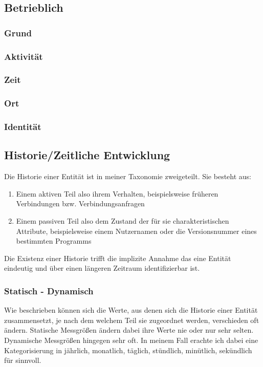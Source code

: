 \subsection{Betrieblich}
\subsubsection{Grund}
\subsubsection{Aktivität}
\subsubsection{Zeit}
\subsubsection{Ort}
\subsubsection{Identität}

\subsection{Historie/Zeitliche Entwicklung}
Die Historie einer Entität ist in meiner Taxonomie zweigeteilt. Sie besteht aus:
\begin{enumerate}
\item{Einem aktiven Teil also ihrem Verhalten, beispielsweise früheren Verbindungen bzw. Verbindungsanfragen}
\item{Einem passiven Teil also dem Zustand der für sie charakteristischen Attribute, beispielsweise einem Nutzernamen oder die Versionsnummer eines bestimmten Programms}
\end{enumerate}
Die Existenz einer Historie trifft die implizite Annahme das eine Entität eindeutig und über einen längeren Zeitraum identifizierbar ist.
\subsubsection{Statisch - Dynamisch}
Wie 
 beschrieben können sich die Werte, aus denen sich die Historie einer Entität zusammensetzt, je nach dem welchem Teil sie zugeordnet werden, verschieden oft ändern.
Statische Messgrößen ändern dabei ihre Werte nie oder nur sehr selten. Dynamische Messgrößen hingegen sehr oft. In meinem Fall erachte ich dabei eine Kategorisierung in jährlich, monatlich, täglich, stündlich, minütlich, sekündlich für sinnvoll.


